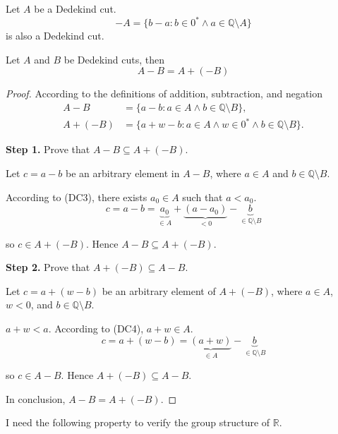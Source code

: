 \begin{theorem}
    Let $A$ be a Dedekind cut.
    \[
        -A = \{ b - a : b\in{0}^{*} \wedge a\in\mathbb{Q}\setminus A \}
    \]
    is also a Dedekind cut.
\end{theorem}

\begin{theorem}\label{theorem:negation-and-subtraction}
    Let $A$ and $B$ be Dedekind cuts, then
    \[
        A - B = A + (-B)
    \]
\end{theorem}

\begin{proof}
    \par According to the definitions of addition, subtraction, and negation
    \begin{align*}
        A - B    & = \{ a - b : a\in A\land b\in\mathbb{Q}\setminus B \},                      \\
        A + (-B) & = \{ a + w - b : a\in A\land w\in{0}^{*}\land b\in\mathbb{Q}\setminus B \}.
    \end{align*}
    \par\textbf{Step 1.} Prove that $A - B\subseteq A + (-B)$.
    \par Let $c = a - b$ be an arbitrary element in $A - B$, where $a\in A$ and $b\in\mathbb{Q}\setminus B$.
    \par According to (DC3), there exists $a_{0}\in A$ such that $a < a_{0}$.
    \[
        c = a - b = \underbrace{a_{0}}_{\in A} + \underbrace{(a - a_{0})}_{< 0} - \underbrace{b}_{\in\mathbb{Q}\setminus B}
    \]
    \par so $c\in A + (-B)$. Hence $A - B\subseteq A + (-B)$.
    \bigskip
    \par\textbf{Step 2.} Prove that $A + (-B)\subseteq A - B$.
    \par Let $c = a + (w - b)$ be an arbitrary element of $A + (-B)$, where $a\in A$, $w < 0$, and $b\in\mathbb{Q}\setminus B$.
    \par $a + w < a$. According to (DC4), $a + w\in A$.
    \[
        c = a + (w - b) = \underbrace{(a + w)}_{\in A} - \underbrace{b}_{\in\mathbb{Q}\setminus B}
    \]
    \par so $c\in A - B$. Hence $A + (-B)\subseteq A - B$.
    \bigskip
    \par In conclusion, $A - B = A + (-B)$.
\end{proof}

I need the following property to verify the group structure of $\mathbb{R}$.

